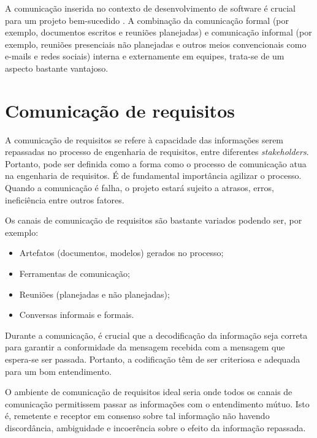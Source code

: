 A comunicação inserida no contexto de desenvolvimento de software é crucial para um projeto bem-sucedido \cite{pernstal, liskin2015artifacts}. A combinação da comunicação formal (por exemplo, documentos escritos e reuniões planejadas) e comunicação informal (por exemplo, reuniões presenciais não planejadas e outros meios convencionais como e-mails e redes sociais) interna e externamente em equipes, trata-se de um aspecto bastante vantajoso. 


\section{Comunicação de requisitos}

    A comunicação de requisitos se refere à capacidade das informações serem repassadas no processo de engenharia de requisitos, entre diferentes \emph{stakeholders}. Portanto, pode ser definida como a forma como o processo de comunicação atua na engenharia de requisitos. É de fundamental importância agilizar o processo. Quando a comunicação é falha, o projeto estará sujeito a atrasos, erros, ineficiência entre outros fatores.
    
Os canais de comunicação de requisitos são bastante variados podendo ser, por exemplo: 
    
\begin{itemize}
    \item Artefatos (documentos, modelos) gerados no processo;
    \item Ferramentas de comunicação;
    \item Reuniões (planejadas e não planejadas);
    \item Conversas informais e formais.
\end{itemize}

    Durante a comunicação, é crucial que a decodificação da informação seja correta para garantir a conformidade da mensagem recebida com a mensagem que espera-se ser passada. Portanto, a codificação têm de ser criteriosa e adequada para um bom entendimento.%
        
    O ambiente de comunicação de requisitos ideal seria onde todos os canais de comunicação permitissem passar as informações com o entendimento mútuo. Isto é, remetente e receptor em consenso sobre tal informação não havendo discordância, ambiguidade e incoerência sobre o efeito da informação repassada.


